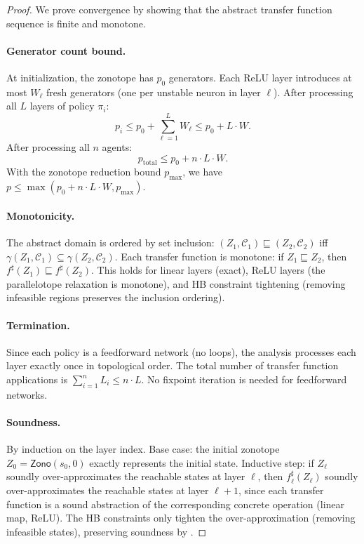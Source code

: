 \documentclass[11pt]{article}
\newcommand{\calC}{\mathcal{C}}
\newcommand{\zo}{\mathsf{Zono}}
\begin{document}
\begin{proof}
We prove convergence by showing that the abstract transfer function
sequence is finite and monotone.

\paragraph{Generator count bound.}
At initialization, the zonotope has $p_0$ generators. Each ReLU layer
introduces at most $W_\ell$ fresh generators (one per unstable neuron in
layer $\ell$). After processing all $L$ layers of policy $\pi_i$:
\[
  p_i \leq p_0 + \sum_{\ell=1}^{L} W_\ell \leq p_0 + L \cdot W.
\]
After processing all $n$ agents:
\[
  p_{\text{total}} \leq p_0 + n \cdot L \cdot W.
\]
With the zonotope reduction bound $p_{\max}$, we have $p \leq \max(p_0 + n \cdot L \cdot W, p_{\max})$.

\paragraph{Monotonicity.}
The abstract domain is ordered by set inclusion: $(Z_1, \calC_1) \sqsubseteq (Z_2, \calC_2)$
iff $\gamma(Z_1, \calC_1) \subseteq \gamma(Z_2, \calC_2)$. Each transfer function
is monotone: if $Z_1 \sqsubseteq Z_2$, then $f^\sharp(Z_1) \sqsubseteq f^\sharp(Z_2)$.
This holds for linear layers (exact), ReLU layers (the parallelotope relaxation
is monotone), and HB constraint tightening (removing infeasible regions preserves
the inclusion ordering).

\paragraph{Termination.}
Since each policy is a feedforward network (no loops), the analysis processes
each layer exactly once in topological order. The total number of transfer
function applications is $\sum_{i=1}^{n} L_i \leq n \cdot L$. No fixpoint
iteration is needed for feedforward networks.

\paragraph{Soundness.}
By induction on the layer index. Base case: the initial zonotope
$Z_0 = \zo(s_0, 0)$ exactly represents the initial state. Inductive step:
if $Z_\ell$ soundly over-approximates the reachable states at layer $\ell$,
then $f^\sharp_\ell(Z_\ell)$ soundly over-approximates the reachable states
at layer $\ell + 1$, since each transfer function is a sound abstraction of
the corresponding concrete operation (linear map, ReLU). The HB constraints
only tighten the over-approximation (removing infeasible states), preserving
soundness by .
\end{proof}
\end{document}
